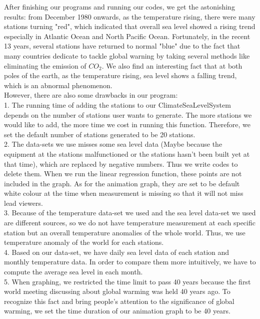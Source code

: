\documentclass[fontsize=11pt]{article}
\begin{document}
    After finishing our programs and running our codes, we get the astonishing results: from December 1980 onwards, as the temperature rising, there were many stations turning "red", which indicated that overall sea level showed a rising trend especially in Atlantic Ocean and North Pacific Ocean. Fortunately, in the recent 13 years, several stations have returned to normal "blue" due to the fact that many countries dedicate to tackle global warning by taking several methods like eliminating the emission of $CO_2$. We also find an interesting fact that at both poles of the earth, as the temperature rising, sea level shows a falling trend, which is an abnormal phenomenon.\\
    However, there are also some drawbacks in our program:\\
    1. The running time of adding the stations to our ClimateSeaLevelSystem depends on the number of stations user wants to generate. The more stations we would like to add, the more time we cost in running this function. Therefore, we set the default number of stations generated to be 20 stations.\\
    2. The data-sets we use misses some sea level data (Maybe because the equipment at the stations malfunctioned or the stations hasn't been built yet at that time), which are replaced by negative numbers. Thus we write codes to delete them. When we run the linear regression function, these points are not included in the graph. As for the animation graph, they are set to be default white colour at the time when measurement is missing so that it will not miss lead viewers.\\
    3. Because of the temperature data-set we used and the sea level data-set we used are different sources, so we do not have temperature measurement at each specific station but an overall temperature anomalies of the whole world. Thus, we use temperature anomaly of the world for each stations. \\
    4. Based on our data-set, we have daily sea level data of each station and monthly temperature data. In order to compare them more intuitively, we have to compute the average sea level in each month. \\
    5. When graphing, we restricted the time limit to pass 40 years because the first world meeting discussing about global warming was held 40 years ago. To recognize this fact and bring people's attention to the significance of global warming, we set the time duration of our animation graph to be 40 years.\\
\end{document}
